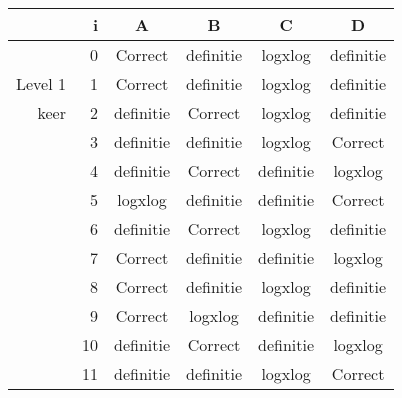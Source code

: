 \begin{tabular}{ rr| c|c|c|c}\hline\hline
     & i & \textbf{A} & \textbf{B} & \textbf{C} & \textbf{D}\\\hline

&0&Correct\cellcolor[gray]{0.6}&definitie&logxlog&definitie\\
Level 1 & 1&Correct\cellcolor[gray]{0.6}&definitie&logxlog&definitie\\
keer &2&definitie&Correct\cellcolor[gray]{0.6}&logxlog&definitie\\
&3&definitie&definitie&logxlog&Correct\cellcolor[gray]{0.6}\\
&4&definitie&Correct\cellcolor[gray]{0.6}&definitie&logxlog\\
&5&logxlog&definitie&definitie&Correct\cellcolor[gray]{0.6}\\
&6&definitie&Correct\cellcolor[gray]{0.6}&logxlog&definitie\\
&7&Correct\cellcolor[gray]{0.6}&definitie&definitie&logxlog\\
&8&Correct\cellcolor[gray]{0.6}&definitie&logxlog&definitie\\
&9&Correct\cellcolor[gray]{0.6}&logxlog&definitie&definitie\\
&10&definitie&Correct\cellcolor[gray]{0.6}&definitie&logxlog\\
&11&definitie&definitie&logxlog&Correct\cellcolor[gray]{0.6}\\
\hline\end{tabular}\par\ \newline

